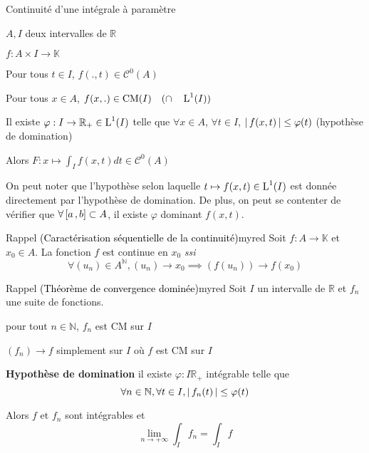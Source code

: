     \begin{theo}{Continuité d’une intégrale à paramètre}{}
        \begin{soit}
            \item $A,I$ deux intervalles de $\mathbb{R}$
            \item $f : A \times I \to \mathbb{K}$
        \end{soit}
        \begin{suppose}
            \item Pour tous $t \in I$, $f(.,t) \in \mathcal{C}^0(A)$
            \item Pour tous $x \in A$, $f(x,.) \in \operatorname{CM}(I) \quad (\cap \quad \operatorname{L}^1(I))$
            \item Il existe $\varphi : I \to \mathbb{R}_+ \in \operatorname{L}^1(I)$ telle que $\forall x \in A$, $\forall t \in I$, $\left\lvert \,f(x,t) \, \right\rvert \leq \varphi(t)$ (hypothèse de domination)
        \end{suppose}
        Alors $F : x \mapsto \int_{I} f(x,t) dt \in \mathcal{C}^0(A)$
    \end{theo}

    On peut noter que l’hypothèse selon laquelle $t \mapsto f(x,t) \in \operatorname{L}^1(I)$ est donnée directement par l’hypothèse de domination. De plus, on peut se contenter de vérifier que $\forall \left[ a \, , b \right] \subset A$, il existe $\varphi$ dominant $f(x,t)$.

    \begin{omed}{Rappel \textcolor{black}{(Caractérisation séquentielle de la continuité)}}{myred}
        Soit $f : A \to \mathbb{K}$ et $x_0 \in A$. La fonction $f$ est continue en $x_0$ \textit{ssi} 
        \[ \forall (u_n) \in A^{\mathbb{N}}, (u_n) \to x_0 \implies (f(u_n)) \to f(x_0) \]   
    \end{omed}

    \begin{omed}{Rappel \textcolor{black}{(Théorème de convergence dominée)}}{myred}
        Soit $I$ un intervalle de $\mathbb{R}$ et $f_n$ une suite de fonctions. 
        \begin{suppose}
            \item pour tout $n \in \mathbb{N}$, $f_n$ est CM sur $I$
            \item $(f_n) \to f$ simplement sur $I$ où $f$ est CM sur $I$
            \item \textbf{Hypothèse de domination} \quad il existe $\varphi : I \mathbb{R}_+$ intégrable telle que 
            \[ \forall n \in \mathbb{N}, \forall t \in I, \left\lvert \,f_n(t) \, \right\rvert \leq \varphi(t) \]   
        \end{suppose}
        Alors $f$ et $f_n$ sont intégrables et 
        \[ \lim_{n \to +\infty} \int_I f_n = \int_I f \]
    \end{omed}

